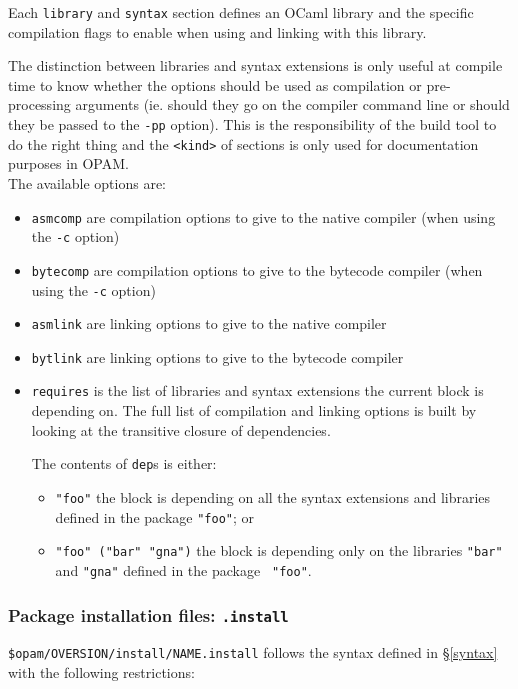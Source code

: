\documentclass[a4paper,11pt]{article}
\begin{document}
Each {\tt library} and {\tt syntax} section defines an OCaml library
and the specific compilation flags to enable when using and linking
with this library.

The distinction between libraries and syntax extensions is only useful
at compile time to know whether the options should be used as
compilation or pre-processing arguments (ie. should they go on the
compiler command line or should they be passed to the {\tt -pp}
option). This is the responsibility of the build tool to do the right
thing and the {\tt <kind>} of sections is only used for documentation
purposes in OPAM. \\

The available options are:

\begin{itemize}
\item {\tt asmcomp} are compilation options to give to the native
  compiler (when using the {\tt -c} option)
\item {\tt bytecomp} are compilation options to give to the bytecode
  compiler (when using the {\tt -c} option)
\item {\tt asmlink} are linking options to give to the native compiler 
\item {\tt bytlink} are linking options to give to the bytecode
  compiler
\item {\tt requires} is the list of libraries and syntax extensions
  the current block is depending on. The full list of compilation
  and linking options is built by looking at the transitive closure of
  dependencies.

  The contents of {\tt dep}s is either:
  \begin{itemize}
  \item {\tt "foo"} the block is depending on all the syntax
    extensions and libraries defined in the package {\tt "foo"}; or
  \item {\tt "foo" ("bar" "gna")} the block is depending only on the
    libraries {\tt "bar"} and {\tt "gna"} defined in the package {\tt
      "foo"}.
  \end{itemize}
\end{itemize}

\subsubsection{Package installation files: {\tt .install}}
\label{dotinstall}

\verb+$opam/OVERSION/install/NAME.install+ follows the syntax defined
in \S\ref{syntax} with the following restrictions:
\end{document}
